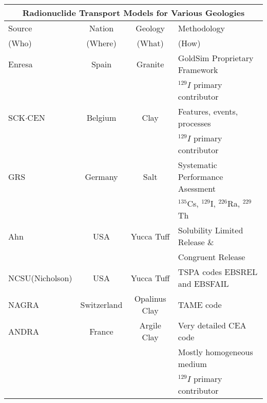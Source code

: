  \begin{table}[h!]
    \centering
    \footnotesize{
    \begin{tabular}{|l|c|c|l|}
      \multicolumn{4}{c}{\textbf{Radionuclide Transport Models for Various Geologies}}\\
      \hline
      Source & Nation & Geology & Methodology \\  
      (Who) & (Where) & (What) & (How) \\  
      \hline
      Enresa \cite{von_lensa_red-impact_2008}           & Spain       & Granite                   &  GoldSim Proprietary Framework\\ 
                                                        &             &                           & $^{129}I$ primary contributor \\
      SCK$\cdot$CEN   \cite{von_lensa_red-impact_2008}  & Belgium     & Clay                      & Features, events, processes\\
                                                        &             &                           & $^{129}I$ primary contributor \\
      GRS \cite{von_lensa_red-impact_2008}              & Germany     & Salt                      & Systematic Performance Asessment \\
                                                        &             &                           & $^{135}$Cs, $^{129}$I, $^{226}$Ra, $^{229}$Th \\
      Ahn \cite{ahn_environmental_2004, ahn_environmental_2007} & USA     & Yucca Tuff            & Solubility Limited Release \& \\ 
                                                        &             &                           & Congruent Release  \\
      NCSU(Nicholson) \cite{li_methodology_2006}        & USA         & Yucca Tuff                & TSPA codes EBSREL and EBSFAIL  \\ 
      NAGRA \cite{johnson_project_2002, johnson_calculations_2002}  & Switzerland & Opalinus Clay & TAME code  \\
      ANDRA \cite{andra_argile:_2005}                   & France      & Argile Clay               & Very detailed CEA code  \\
                                                        &             &                           & Mostly homogeneous medium \\
                                                        &             &                           & $^{129}I$ primary contributor \\

\end{tabular}}
\end{table}
